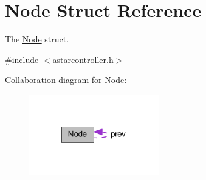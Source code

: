 \hypertarget{structNode}{}\section{Node Struct Reference}
\label{structNode}


The \hyperlink{structNode}{Node} struct.  




{\ttfamily \#include $<$astarcontroller.\+h$>$}



Collaboration diagram for Node\+:
\nopagebreak
\begin{figure}[H]
\begin{center}
\leavevmode
\includegraphics[width=160pt]{d6/d2c/structNode__coll__graph}
\end{center}
\end{figure}
